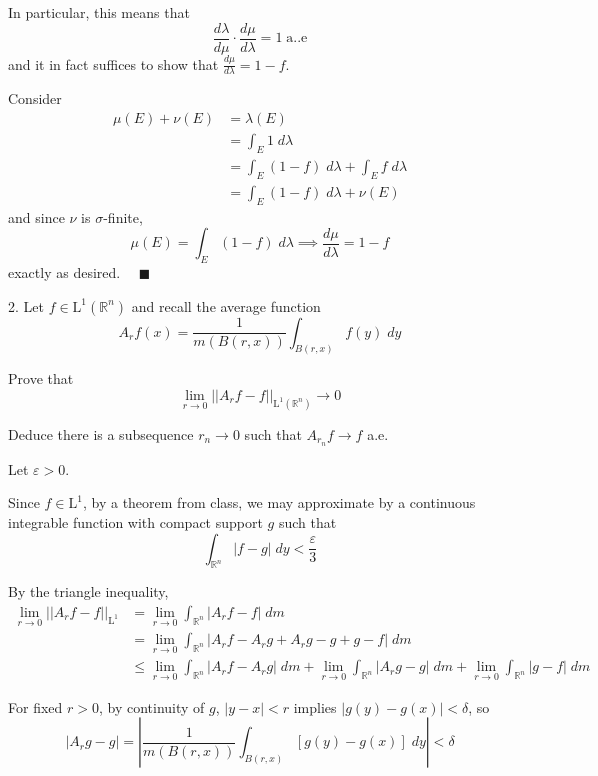 \documentclass[12pt]{article}
\newcommand{\R}{\mathbb{R}}
\newcommand{\qed}{\quad \blacksquare}
\newcommand{\abs}[1]{\left\vert #1 \right\vert}
\newcommand{\norm}[1]{\left\vert\left\vert #1 \right\vert\right\vert}
\newcommand{\ep}{\varepsilon}
\renewcommand{\L}{\text{L}}
\begin{document}
        In particular, this means that 
        \[\frac{d\lambda}{d\mu} \cdot \frac{d\mu}{d\lambda} = 1 \; \text{a..e}\]
        and it in fact suffices to show that $\frac{d\mu}{d\lambda} = 1 - f$. 

        Consider
        \begin{align*}
            \mu(E) + \nu(E) &= \lambda(E)\\ 
                 &= \int_E 1 \; d\lambda\\ 
                 &= \int_E (1 - f) \; d\lambda + \int_E f \; d\lambda\\
                    &= \int_E (1 - f) \; d\lambda + \nu(E)
        \end{align*} 
        and since $\nu$ is $\sigma$-finite, 
        \[\mu(E) = \int_E (1 - f)\; d\lambda \implies \frac{d\mu}{d\lambda} = 1 - f\]
        exactly as desired. $\qed$
    \color{black}


\pagebreak

2. Let $f \in \L^1(\R^n)$ and recall the average function 
\[A_r f(x) = \frac{1}{m(B(r, x))} \int_{B(r, x)} f(y)\; dy\]

Prove that 
\[\lim_{r \to 0} \norm{A_r f - f}_{\L^1(\R^n)} \to 0\]

Deduce there is a subsequence $r_n \to 0$ such that $A_{r_n} f \to f$ a.e. 

    \color{blue}
        Let $\ep > 0$. 
    
        Since $f \in \L^1$, by a theorem from class, we may approximate by a continuous integrable function with compact support $g$ such that 
        \[\int_{\R^n} \abs{f - g} \; dy < \frac{\ep}{3}\]

        By the triangle inequality, 
        \begin{align*}
            \lim_{r \to 0} \norm{A_r f - f}_{\L^1} &= \lim_{r \to 0} \int_{\R^n} \abs{A_r f - f}\; dm\\ 
                &= \lim_{r \to 0} \int_{\R^n} \abs{A_r f - A_r g + A_r g - g + g - f}\; dm\\
                &\leq \lim_{r \to 0} \int_{\R^n} \abs{A_r f - A_r g}\; dm + \lim_{r \to 0} \int_{\R^n} \abs{A_r g - g}\; dm + \lim_{r \to 0} \int_{\R^n} \abs{g - f}\; dm
        \end{align*}

        For fixed $r > 0$, by continuity of $g$, $\abs{y - x} < r$ implies $\abs{g(y) - g(x)} < \delta$, so 
        \[\abs{A_r g - g} = \abs{\frac{1}{m(B(r, x))}\int_{B(r, x)} [g(y) - g(x)] \; dy} < \delta\]
        
\end{document}
